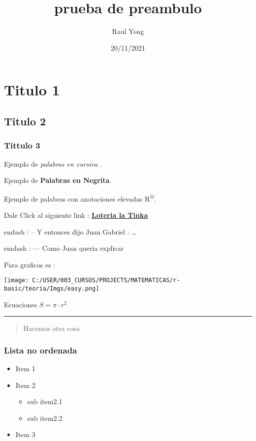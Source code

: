 \documentclass[
]{article}
\title{prueba de preambulo}
\author{Raul Yong}
\date{20/11/2021}
\providecommand{\tightlist}{%
  \setlength{\itemsep}{0pt}\setlength{\parskip}{0pt}}
\begin{document}
\maketitle

\hypertarget{titulo-1}{%
\section{Titulo 1}\label{titulo-1}}

\hypertarget{titulo-2}{%
\subsection{Titulo 2}\label{titulo-2}}

\hypertarget{tittulo-3}{%
\subsubsection{Tittulo 3}\label{tittulo-3}}

Ejemplo de \emph{palabras en cursiva }.

Ejemplo de \textbf{Palabras en Negrita}.

Ejemplo de palabras con anotaciones elevadas R\textsuperscript{@}.

Dale Click al siguiente link :
\textbf{\href{https://www.latinka.com.pe/p/\#}{Loteria la Tinka}}

endash : -- Y entonces dijo Juan Gabriel : \ldots{}

emdash : --- Como Juan queria explicar

Para graficos es :

\texttt{[image: C:/USER/003\_CURSOS/PROJECTS/MATEMATICAS/r-basic/teoria/Imgs/easy.png]}

Ecuaciones \(S= \pi\cdot r^2\)

\begin{center}\rule{0.5\linewidth}{0.5pt}\end{center}

\begin{quote}
Hacemos otra cosa
\end{quote}

\hypertarget{lista-no-ordenada}{%
\subsubsection{Lista no ordenada}\label{lista-no-ordenada}}

\begin{itemize}
\tightlist
\item
  Item 1
\item
  Item 2

  \begin{itemize}
  \tightlist
  \item
    sub item2.1
  \item
    sub item2.2
  \end{itemize}
\item
  Item 3
\end{itemize}
\end{document}
